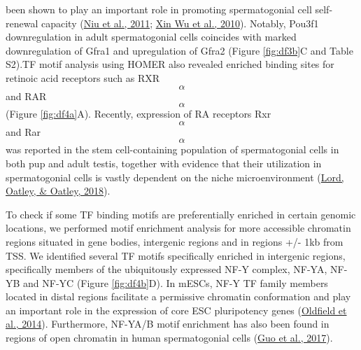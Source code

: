 \documentclass[12pt,twoside]{reedthesis}
\begin{document}
been shown to play an important role in promoting spermatogonial cell
self-renewal capacity (\protect\hyperlink{ref-niu2011}{Niu et al., 2011}; \protect\hyperlink{ref-wu2010a}{Xin Wu et al., 2010}). Notably, Pou3f1
downregulation in adult spermatogonial cells coincides with marked
downregulation of Gfra1 and upregulation of Gfra2 (Figure \ref{fig:df3b}C and Table
S2).TF motif analysis using HOMER also revealed enriched binding sites
for retinoic acid receptors such as RXR\[\alpha\] and RAR\[\alpha\]
(Figure \ref{fig:df4a}A). Recently, expression of RA receptors Rxr\[\alpha\] and
Rar\[\alpha\] was reported in the stem cell-containing population of
spermatogonial cells in both pup and adult testis, together with
evidence that their utilization in spermatogonial cells is vastly
dependent on the niche microenvironment (\protect\hyperlink{ref-lord2018}{Lord, Oatley, \& Oatley, 2018}).

To check if some TF binding motifs are preferentially enriched in
certain genomic locations, we performed motif enrichment analysis for
more accessible chromatin regions situated in gene bodies, intergenic
regions and in regions +/- 1kb from TSS. We identified several TF motifs
specifically enriched in intergenic regions, specifically members of the
ubiquitously expressed NF-Y complex, NF-YA, NF-YB and NF-YC (Figure \ref{fig:df4b}D).
In mESCs, NF-Y TF family members located in distal regions facilitate a
permissive chromatin conformation and play an important role in the
expression of core ESC pluripotency genes (\protect\hyperlink{ref-oldfield2014}{Oldfield et al., 2014}). Furthermore,
NF-YA/B motif enrichment has also been found in regions of open
chromatin in human spermatogonial cells (\protect\hyperlink{ref-guo2017}{Guo et al., 2017}).
\end{document}
